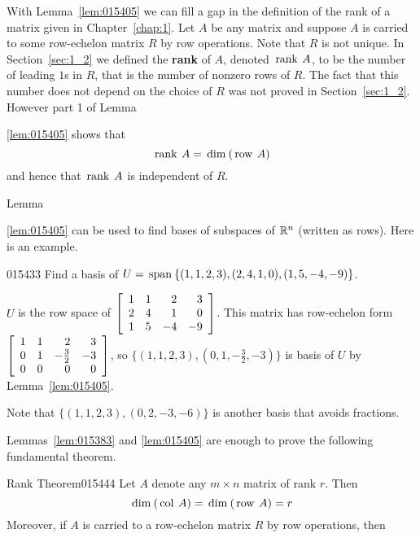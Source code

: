 With Lemma~\ref{lem:015405} we can fill a gap in the definition of the rank of a matrix given in Chapter~\ref{chap:1}. Let $A$ be any matrix and suppose $A$ is carried to some row-echelon matrix $R$ by row operations. Note that $R$ is not unique. In Section~\ref{sec:1_2} we defined the \textbf{rank} of $A$, denoted $\thinspace\operatorname{rank\medspace} A$, to be the number of leading $1$s in $R$, that is the number of nonzero rows of $R$. The fact that this number does not depend on the choice of $R$ was not proved in Section~\ref{sec:1_2}. However part 1 of Lemma~{\ref{lem:015405} shows that
\begin{equation*}
\thinspace\operatorname{rank \medspace} A = \thinspace\operatorname{dim\medspace} (\thinspace\operatorname{row \medspace} A)
\end{equation*}
and hence that $\thinspace\operatorname{rank\medspace} A$ is independent of $R$.

Lemma~{\ref{lem:015405} can be used to find bases of subspaces of $\mathbb{R}^n$ (written as rows). Here is an example.

\begin{example}{}{015433}
Find a basis of $U = \thinspace\operatorname{span\medspace}\{(1, 1, 2, 3), (2, 4, 1, 0), (1, 5, -4, -9)\}$.

\begin{solution}
$U$ is the row space of $\left[ \begin{array}{rrrr}
1 & 1 & 2 & 3 \\
2 & 4 & 1 & 0 \\
1 & 5 & -4&-9
\end{array} \right]$. This matrix has row-echelon form
$\left[ \begin{array}{rrrr}
1 & 1 & 2 & 3 \\
0 & 1 & -\tfrac{3}{2} & -3 \\
0 & 0 & 0 & 0
\end{array} \right]$, so $\{(1, 1, 2, 3), (0, 1, - \frac{3}{2}, -3)\}$ is basis of $U$ by Lemma~\ref{lem:015405}.

Note that $\{(1, 1, 2, 3), (0, 2, -3, -6)\}$ is another basis that avoids fractions.
\end{solution}
\end{example}

Lemmas~\ref{lem:015383} and \ref{lem:015405} are enough to prove the following fundamental theorem.

\begin{theorem}{Rank Theorem}{015444} %
Let $A$ denote any $m \times n$ matrix of rank $r$. Then
\begin{equation*}
\thinspace\operatorname{dim\medspace}(\thinspace\operatorname{col \medspace}A ) = \thinspace\operatorname{dim\medspace} (\thinspace\operatorname{row \medspace} A) = r
\end{equation*}
Moreover, if $A$ is carried to a row-echelon matrix $R$ by row operations, then


\end{theorem}}}
